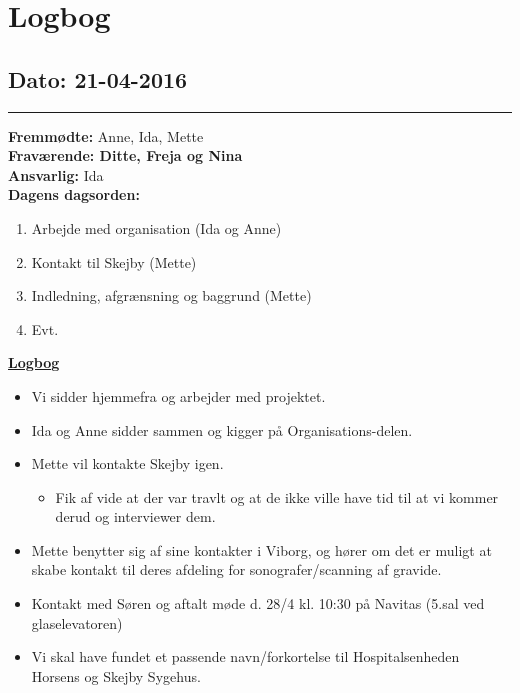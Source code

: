 \chapter{Logbog}
\section{Dato: 21-04-2016}
\hrule
\textbf{Fremmødte: }Anne, Ida, Mette \\
\textbf{Fraværende: Ditte, Freja og Nina } \\
\textbf{Ansvarlig: }Ida  \\
\textbf{Dagens dagsorden: }
\begin{enumerate}
	\item Arbejde med organisation (Ida og Anne)
	\item Kontakt til Skejby (Mette)
	\item Indledning, afgrænsning og baggrund (Mette)
	\item Evt. 
\end{enumerate}


\underline{\textbf{Logbog}}
\begin{itemize}
\item Vi sidder hjemmefra og arbejder med projektet.
\item Ida og Anne sidder sammen og kigger på Organisations-delen.
\item Mette vil kontakte Skejby igen.
\begin{itemize}
\item Fik af vide at der var travlt og at de ikke ville have tid til at vi kommer derud og interviewer dem.
\end{itemize}
\item Mette benytter sig af sine kontakter i Viborg, og hører om det er muligt at skabe kontakt til deres afdeling for sonografer/scanning af gravide.
\item Kontakt med Søren og aftalt møde d. 28/4 kl. 10:30 på Navitas (5.sal ved glaselevatoren)
\item Vi skal have fundet et passende navn/forkortelse til Hospitalsenheden Horsens og Skejby Sygehus.
\end{itemize}
